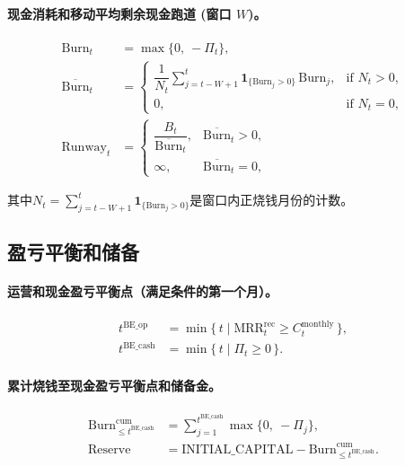 \documentclass[11pt, a4paper, oneside]{article}
\begin{document}
\paragraph{现金消耗和移动平均剩余现金跑道 (窗口 $W$)。}
\begin{align}
\mathrm{Burn}_t &= \max\{0,\ -\Pi_t\},\\
\overline{\mathrm{Burn}}_t 
  &= 
  \begin{cases}
    \dfrac{1}{N_t} \sum_{j=t-W+1}^{t} \mathbf{1}_{\{\mathrm{Burn}_j>0\}}\, \mathrm{Burn}_j, & \text{if } N_t>0,\\[6pt]
    0, & \text{if } N_t=0,
  \end{cases}\\
\mathrm{Runway}_t 
  &= 
  \begin{cases}
    \dfrac{B_t}{\overline{\mathrm{Burn}}_t}, & \overline{\mathrm{Burn}}_t > 0,\\[6pt]
    \infty, & \overline{\mathrm{Burn}}_t = 0,
  \end{cases}
\end{align}



其中$N_t=\sum_{j=t-W+1}^{t}\mathbf{1}_{\{\mathrm{Burn}_j>0\}}$是窗口内正烧钱月份的计数。

\subsection{盈亏平衡和储备}
\paragraph{运营和现金盈亏平衡点（满足条件的第一个月）。}
\begin{align}
t^{\mathrm{BE\_op}} 
  &= \min\{\, t \mid \mathrm{MRR}^{\mathrm{rec}}_t \ge C^{\mathrm{monthly}}_t \,\},\\
t^{\mathrm{BE\_cash}} 
  &= \min\{\, t \mid \Pi_t \ge 0 \,\}.
\end{align}

\paragraph{累计烧钱至现金盈亏平衡点和储备金。}
\begin{align}
\mathrm{Burn}^{\mathrm{cum}}_{\le t^{\mathrm{BE\_cash}}} 
  &= \sum_{j=1}^{t^{\mathrm{BE\_cash}}} \max\{0,\ -\Pi_j\},\\
\mathrm{Reserve}
  &= \text{INITIAL\_CAPITAL} - \mathrm{Burn}^{\mathrm{cum}}_{\le t^{\mathrm{BE\_cash}}}.
\end{align}
\end{document}
